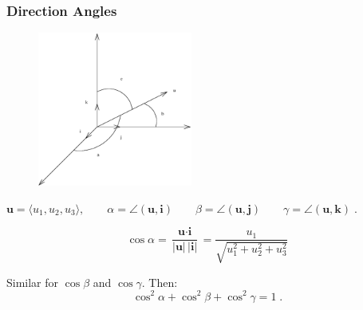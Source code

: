 \begin{frame}
 \frametitle{Direction Angles}

\begin{figure}[h]
  \includegraphics[height=2in]{../../modules/vectors/pictures/ok-direction_angles.eps}
\end{figure}


$\textbf{u} = \langle u_1, u_2, u_3\rangle, \qquad \alpha = \angle (\textbf{u},\textbf{i}) \qquad \beta =
\angle (\textbf{u},\textbf{j}) \qquad \gamma = \angle (\textbf{u},\textbf{k}) \; .$

$$\cos{\alpha} = \frac{\textbf{u} \cdot \textbf{i}}{|\textbf{u}|\, |\textbf{i}|} =
\frac{u_1}{\sqrt{u_1^2+u_2^2+u_3^2}}$$

Similar for $\cos{\beta}$ and $\cos{\gamma}$. Then:
%
$$\cos^2\alpha + \cos^2\beta + \cos^2\gamma = 1\; .$$

\end{frame}
